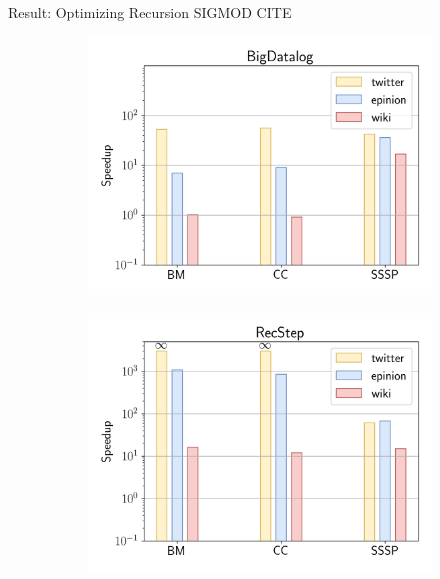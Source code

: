 \documentclass{beamer}
\begin{document}
  \begin{frame}{Result: Optimizing Recursion}
    SIGMOD CITE
    \begin{figure}
      \begin{subfigure}[b]{0.4\textwidth}
        \centering
        \includegraphics[width=\textwidth]{basic-bd}
      \end{subfigure}
      \hfill
      \begin{subfigure}[b]{0.4\textwidth}
        \centering
        \includegraphics[width=\textwidth]{basic-rs}
      \end{subfigure}


\end{figure}
\end{frame}
\end{document}
